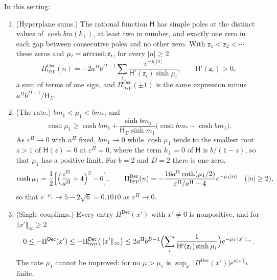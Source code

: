 \begin{proposition}\label{prop:ren-decay-rate}
In this setting:
\begin{enumerate}
\item[(a)] (Hyperplane sums.) The rational function $\mathsf H$ has simple poles at the distinct values of $\cosh bm(k_\perp)$, at least two in number, and exactly one zero in each gap between consecutive poles and no other zero. With $\mathsf z_1<\mathsf z_2<\cdots$ these zeros and $\mu_i=\operatorname{arccosh}\mathsf z_i$, for every $\lvert n\rvert\ge2$
\begin{equation}\label{eq:ren-decay-hyp}
\Pi^{\mathsf{Dec}}_{\mathrm{hyp}}(n)=-2a^\Pi b^{D-1}\sum_i\frac{e^{-\mu_i\lvert n\rvert}}{\mathsf H'(\mathsf z_i)\sinh\mu_i},\qquad\mathsf H'(\mathsf z_i)>0,
\end{equation}
a sum of terms of one sign, and $\Pi^{\mathsf{Dec}}_{\mathrm{hyp}}(\pm1)$ is the same expression minus $a^\Pi b^{D-1}/\mathsf H_\Sigma$.
\item[(b)] (The rate.) $bm_1<\mu_1<bm_\ast$, and
\begin{equation}\label{eq:ren-decay-gap}
\cosh\mu_1\ge\cosh bm_1+\frac{\sinh bm_1}{\mathsf H_\Sigma\sinh m_1}\bigl(\cosh bm_\ast-\cosh bm_1\bigr).
\end{equation}
As $\varepsilon^\Pi\to0$ with $a^\Pi$ fixed, $bm_1\to0$ while $\cosh\mu_1$ tends to the smallest root $z>1$ of $\mathsf H(z)=0$ at $\varepsilon^\Pi=0$, where the term $k_\perp=0$ of $\mathsf H$ is $b/(1-z)$, so that $\mu_1$ has a positive limit. For $b=2$ and $D=2$ there is one zero,
\begin{equation}\label{eq:ren-decay-two}
\cosh\mu_1=\frac12\Bigl[\Bigl(\frac{\varepsilon^\Pi}{a^\Pi}+4\Bigr)^2-6\Bigr],\qquad\Pi^{\mathsf{Dec}}_{\mathrm{hyp}}(n)=-\frac{16a^\Pi\coth(\mu_1/2)}{\varepsilon^\Pi/a^\Pi+4}e^{-\mu_1\lvert n\rvert}\quad(\lvert n\rvert\ge2),
\end{equation}
so that $e^{-\mu_1}\to5-2\sqrt6=0.1010$ as $\varepsilon^\Pi\to0$.
\item[(c)] (Single couplings.) Every entry $\Pi^{\mathsf{Dec}}(x')$ with $x'\neq0$ is nonpositive, and for $\Vert x'\Vert_\infty\ge2$
\begin{equation}\label{eq:ren-decay-pointwise}
0\le-\Pi^{\mathsf{Dec}}(x')\le-\Pi^{\mathsf{Dec}}_{\mathrm{hyp}}\bigl(\Vert x'\Vert_\infty\bigr)\le2a^\Pi b^{D-1}\Bigl(\sum_i\frac1{\mathsf H'(\mathsf z_i)\sinh\mu_i}\Bigr)e^{-\mu_1\Vert x'\Vert_\infty}.
\end{equation}
The rate $\mu_1$ cannot be improved: for no $\mu>\mu_1$ is $\sup_{x'}\lvert\Pi^{\mathsf{Dec}}(x')\rvert e^{\mu\Vert x'\Vert_\infty}$ finite.

\end{enumerate}
\end{proposition}
